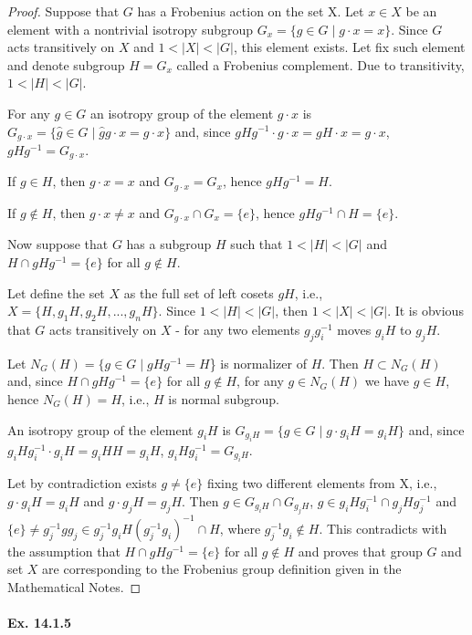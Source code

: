 \documentclass[11pt,a4paper]{article}
\begin{document}
\begin{proof}
Suppose that $G$ has a Frobenius action on the set X. Let $x\in X$ be an element with a nontrivial isotropy subgroup $G_x=\{g\in G\mid g\cdot x=x\}$. Since $G$ acts transitively on $X$ and $1<|X|<|G|$, this element exists. Let fix such element and denote subgroup $H=G_x$ called a Frobenius complement. Due to transitivity, $1<|H|<|G|$. 

For any $g\in G$ an isotropy group of the element $g\cdot x$ is $G_{g\cdot x}=\{\hat g\in G\mid \hat gg\cdot x=g\cdot x\}$ and, since $gHg^{-1}\cdot g\cdot x=gH\cdot x=g\cdot x$, $gHg^{-1}=G_{g\cdot x}$.

If $g\in H$, then $g\cdot x=x$ and $G_{g\cdot x}=G_x$, hence $gHg^{-1}=H$.

If $g\notin H$, then $g\cdot x\neq x$ and $G_{g\cdot x}\cap G_x=\{e\}$, hence $gHg^{-1}\cap H=\{e\}$.

Now suppose that $G$ has a subgroup $H$ such that $1<|H|<|G|$ and $H\cap gHg^{-1}=\{e\}$ for all $g \notin H$. 

Let define the set $X$ as the full set of left cosets $gH$, i.e., $X=\{H,g_1H,g_2H,...,g_nH\}$. Since $1<|H|<|G|$, then $1<|X|<|G|$.
It is obvious that $G$ acts transitively on $X$ - for any two elements $g_jg_i^{-1}$ moves $g_iH$ to $g_jH$.

Let $N_G(H)=\{g\in G\mid gHg^{-1}=H$\} is normalizer of $H$. Then $H\subset N_G(H)$ and, since $H\cap gHg^{-1}=\{e\}$ for all $g \notin H$, for any $g\in N_G(H)$ we have $g\in H$, hence $N_G(H)=H$, i.e., $H$ is normal subgroup. 

An isotropy group of the element $g_iH$ is $G_{g_iH}=\{g\in G\mid  g\cdot g_iH=g_iH\}$ and, since $g_iHg_i^{-1}\cdot g_iH= g_iHH= g_iH$, $g_iHg_i^{-1}=G_{g_iH}$.

Let by contradiction exists $g\ne \{e\}$ fixing two different elements from X, i.e., $g\cdot g_iH=g_iH$ and $g\cdot g_jH=g_jH$. Then $g\in G_{g_iH}\cap G_{g_jH}$, $g\in g_iHg_i^{-1}\cap g_jHg_j^{-1}$ and $\{e\}\ne g_j^{-1}gg_j\in g_j^{-1}g_iH(g_j^{-1}g_i)^{-1}\cap H$, where $g_j^{-1}g_i\notin H$. This contradicts with the assumption that $H\cap gHg^{-1}=\{e\}$ for all $g \notin H$ and proves that group $G$ and set $X$ are corresponding to the Frobenius group definition given in the Mathematical Notes.  

\end{proof}

\paragraph{Ex. 14.1.5}
\end{document}
